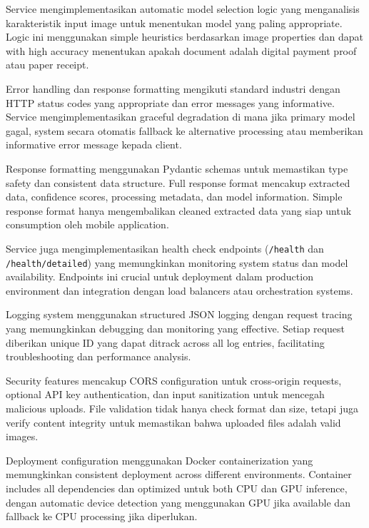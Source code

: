 Service mengimplementasikan automatic model selection logic yang menganalisis karakteristik input image untuk menentukan model yang paling appropriate. Logic ini menggunakan simple heuristics berdasarkan image properties dan dapat with high accuracy menentukan apakah document adalah digital payment proof atau paper receipt.

Error handling dan response formatting mengikuti standard industri dengan HTTP status codes yang appropriate dan error messages yang informative. Service mengimplementasikan graceful degradation di mana jika primary model gagal, system secara otomatis fallback ke alternative processing atau memberikan informative error message kepada client.


Response formatting menggunakan Pydantic schemas untuk memastikan type safety dan consistent data structure. Full response format mencakup extracted data, confidence scores, processing metadata, dan model information. Simple response format hanya mengembalikan cleaned extracted data yang siap untuk consumption oleh mobile application.

Service juga mengimplementasikan health check endpoints (\texttt{/health} dan \texttt{/health/detailed}) yang memungkinkan monitoring system status dan model availability. Endpoints ini crucial untuk deployment dalam production environment dan integration dengan load balancers atau orchestration systems.

Logging system menggunakan structured JSON logging dengan request tracing yang memungkinkan debugging dan monitoring yang effective. Setiap request diberikan unique ID yang dapat ditrack across all log entries, facilitating troubleshooting dan performance analysis.

Security features mencakup CORS configuration untuk cross-origin requests, optional API key authentication, dan input sanitization untuk mencegah malicious uploads. File validation tidak hanya check format dan size, tetapi juga verify content integrity untuk memastikan bahwa uploaded files adalah valid images.

Deployment configuration menggunakan Docker containerization yang memungkinkan consistent deployment across different environments. Container includes all dependencies dan optimized untuk both CPU dan GPU inference, dengan automatic device detection yang menggunakan GPU jika available dan fallback ke CPU processing jika diperlukan.
